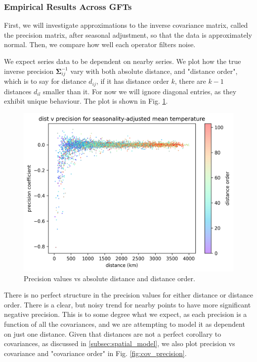 \documentclass[12pt,a4paper]{article} %
\begin{document}
\subsubsection{Empirical Results Across GFTs}
\label{subsec:GFT_comparison}

First, we will investigate approximations to the inverse covariance matrix, called the precision matrix, after seasonal adjustment, so that the data is approximately normal. Then, we compare how well each operator filters noise.

We expect series data to be dependent on nearby series. We plot how the true inverse precision $\pmb{\Sigma}_{ij}^{-1}$ vary with both absolute distance, and "distance order", which is to say for distance $d_{ij}$, if it has distance order $k$, there are $k-1$ distances $d_{il}$ smaller than it. For now we will ignore diagonal entries, as they exhibit unique behaviour. The plot is shown in Fig. \ref{fig:precision}.

\begin{figure}[!ht]
    \centering
    \includegraphics[width=.8\linewidth]{mean_nearest_error_precision_by_dist.png}
    \caption{Precision values vs absolute distance and distance order.}
    \label{fig:precision}
\end{figure}

There is no perfect structure in the precision values for either distance or distance order. There is a clear, but noisy trend for nearby points to have more significant negative precision. This is to some degree what we expect, as each precision is a function of all the covariances, and we are attempting to model it as dependent on just one distance. Given that distances are not a perfect corollary to covariances, as discussed in \ref{subsec:spatial_model}, we also plot precision vs covariance and "covariance order" in Fig. \ref{fig:cov_precision}.
\end{document}
